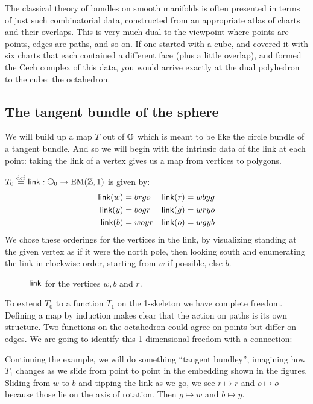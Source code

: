 The classical theory of bundles on smooth manifolds is often presented in terms of just such combinatorial data, constructed from an appropriate atlas of charts and their overlaps. This is very much dual to the viewpoint where points are points, edges are paths, and so on. If one started with a cube, and covered it with six charts that each contained a different face (plus a little overlap), and formed the Cech complex of this data, you would arrive exactly at the dual polyhedron to the cube: the octahedron.

\subsection{The tangent bundle of the sphere}
We will build up a map \( T \) out of \( \mathbb{O} \) which is meant to be like the circle bundle of a tangent bundle. And so we will begin with the intrinsic data of the link at each point: taking the link of a vertex gives us a map from vertices to polygons.

\begin{mydef}
\( T_0\stackrel{\mathrm{def}}{=}\operatorname{\mathsf{link}}:\mathbb{O}_0\to\mathrm{EM}(\mathbb{Z},1) \) is given by:
\begin{align*}
\operatorname{\mathsf{link}}(w) &= brgo & \operatorname{\mathsf{link}}(r) &= wbyg \\
\operatorname{\mathsf{link}}(y) &= bogr & \operatorname{\mathsf{link}}(g) &= wryo \\
\operatorname{\mathsf{link}}(b) &= woyr & \operatorname{\mathsf{link}}(o) &= wgyb
\end{align*}
We chose these orderings for the vertices in the link, by visualizing standing at the given vertex as if it were the north pole, then looking south and enumerating the link in clockwise order, starting from \( w \) if possible, else \( b \).
\end{mydef}

\begin{figure}[h]
\centering

\caption{\( \operatorname{\mathsf{link}} \) for the vertices \( w, b\) and \( r \).}
\label{fig:triangle_of_equators}
\end{figure}

To extend \( T_0 \) to a function \( T_1 \) on the 1-skeleton we have complete freedom. Defining a map by induction makes clear that the action on paths is its own structure. Two functions on the octahedron could agree on points but differ on edges. We are going to identify this 1-dimensional freedom with a connection:

Continuing the example, we will do something ``tangent bundley'', imagining how \( T_1 \) changes as we slide from point to point in the embedding shown in the figures. Sliding from \( w \) to \( b \) and tipping the link as we go, we see \( r\mapsto r \) and \( o\mapsto o \) because those lie on the axis of rotation. Then \( g\mapsto w \) and \( b\mapsto y \). 

